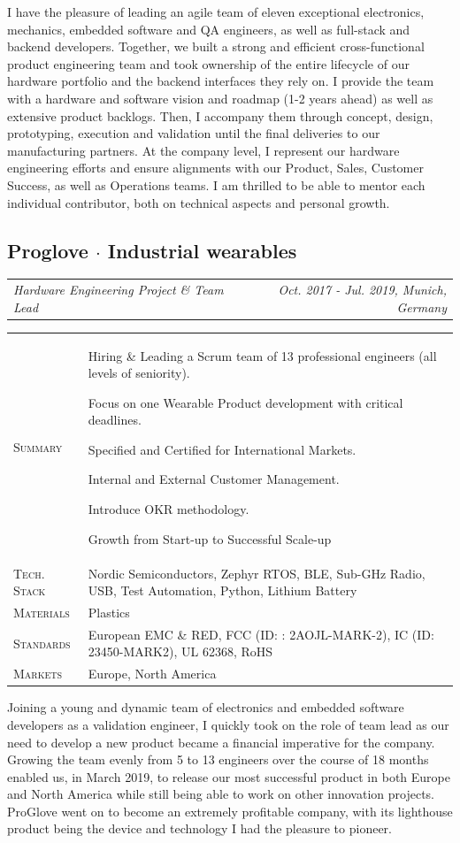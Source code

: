 \documentclass[10pt,a4paper]{moderncv}
\newcommand*{\makecareersubsection}[5]{
  \vspace{0.75em}
  \subsection{#1 {\color{color2}$\cdot$ #2}}
  \addvspace{-0.2em}
  {
    \color{color2}
    \begin{tabularx}{\textwidth}{LR}
      {\itshape #3} & {\itshape #4, #5}
    \end{tabularx}\par
  }
  \addvspace{1.25em}
  }
\begin{document}
  \clearpage

  I have the pleasure of leading an agile team of eleven exceptional electronics, mechanics, embedded software and QA engineers, as well as full-stack and backend developers. Together, we built a strong and efficient cross-functional product engineering team and took ownership of the entire lifecycle of our hardware portfolio and the backend interfaces they rely on. I provide the team with a hardware and software vision and roadmap (1-2 years ahead) as well as extensive product backlogs. Then, I accompany them through concept, design, prototyping, execution and validation until the final deliveries to our manufacturing partners. At the company level, I represent our hardware engineering efforts and ensure alignments with our Product, Sales, Customer Success, as well as Operations teams. I am thrilled to be able to mentor each individual contributor, both on technical aspects and personal growth.

\makecareersubsection{Proglove}{Industrial wearables}
  {Hardware Engineering Project \& Team Lead}
  {Oct. 2017 - Jul. 2019}
  {Munich, Germany}

  \begin{tabularx}{\textwidth}{>{\scshape}l@{\hskip 3.5mm}L}
    Summary & Hiring \& Leading a Scrum team of 13 professional engineers (all levels of seniority).
    \par Focus on one Wearable Product development with critical deadlines.
    \par Specified and Certified for International Markets.
    \par Internal and External Customer Management. 
    \par Introduce OKR methodology.
    \par Growth from Start-up to Successful Scale-up\\
    Tech. Stack & Nordic Semiconductors, Zephyr RTOS, BLE, Sub-GHz Radio, USB, Test Automation, Python, Lithium Battery\\
    Materials & Plastics\\
    Standards & European EMC \& RED, FCC (ID: : 2AOJL-MARK-2), IC (ID: 23450-MARK2), UL 62368, RoHS\\
    Markets & Europe, North America\\
  \end{tabularx}

  \vspace{1.5em}

  Joining a young and dynamic team of electronics and embedded software developers as a validation engineer, I quickly took on the role of team lead as our need to develop a new product became a financial imperative for the company. Growing the team evenly from 5 to 13 engineers over the course of 18 months enabled us, in March 2019, to release our most successful product in both Europe and North America while still being able to work on other innovation projects. ProGlove went on to become an extremely profitable company, with its lighthouse product being the device and technology I had the pleasure to pioneer.
\end{document}
